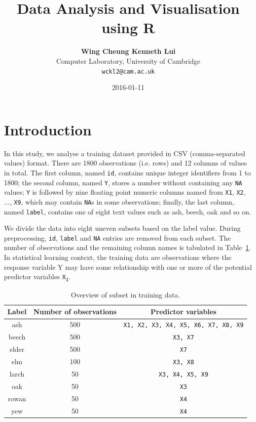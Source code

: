 \documentclass{article}
\title{Data Analysis and Visualisation using R}
\date{2016-01-11}
\author{\textbf{Wing Cheung Kenneth Lui} \\
Computer Laboratory, University of Cambridge \\
{\tt wckl2@cam.ac.uk}}
\begin{document}
  \maketitle

\section{Introduction}

In this study, we analyse a training dataset provided in CSV (comma-separated values) format. There are 1800 observations (i.e. rows) and 12 columns of values in total. The first column, named {\tt id}, contains unique integer identifiers from 1 to 1800; the second column, named {\tt Y}, stores a number without containing any {\tt NA} values; {\tt Y} is followed by nine floating point numeric columns named from {\tt X1}, {\tt X2},  \(...\), {\tt X9}, which may contain {\tt NA}s in some observations; finally, the last column, named {\tt label}, contains one of eight text values such as ash, beech, oak and so on.

We divide the data into eight uneven subsets based on the label value. During preprocessing, {\tt id}, {\tt label} and {\tt NA} entries are removed from each subset. The number of observations and the remaining column names is tabulated in Table~\ref{subset-table}. In statistical learning context, the training data are observations where the response variable Y may have some relationship with one or more of the potential predictor variables {\tt X\textsubscript{i}}.

\begin{table}
\begin{center}
\begin{tabular}{|c|c|c|}
\hline \bf Label & \bf Number of observations & \bf Predictor variables \\ \hline
ash & 500 & {\tt X1, X2, X3, X4, X5, X6, X7, X8, X9} \\ \hline
beech & 500 & {\tt X3, X7} \\ \hline
elder & 500 & {\tt X7} \\ \hline
elm & 100 & {\tt X3, X8} \\ \hline
larch & 50 & {\tt X3, X4, X5, X9} \\ \hline
oak & 50 & {\tt X3} \\ \hline
rowan & 50 & {\tt X4} \\ \hline
yew & 50 & {\tt X4} \\ \hline
\end{tabular}
\end{center}
\caption{\label{subset-table} Overview of subset in training data.}
\end{table}
\end{document}
